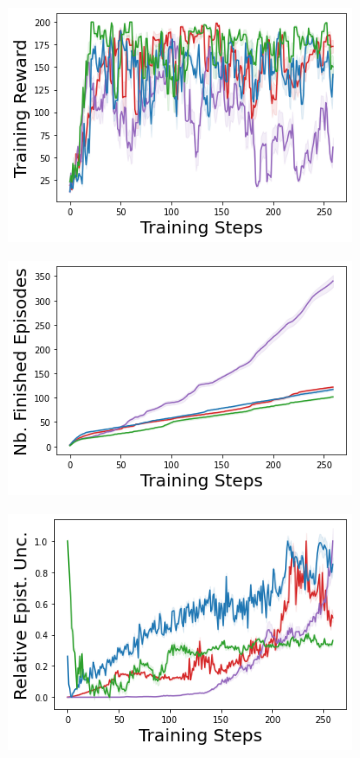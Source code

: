 \begin{figure}
    \begin{subfigure}{.24\textwidth}
        \includegraphics[width=\textwidth]{sections/011_icml2022/resources/cartpole-training_total_reward-training-model.png}
    \end{subfigure}
    \begin{subfigure}{.24\textwidth}
        \includegraphics[width=\textwidth]{sections/011_icml2022/resources/cartpole-n_finished_training_episodes-training-model.png}  
    \end{subfigure}
    \begin{subfigure}{.24\textwidth}
        \includegraphics[width=\textwidth]{sections/011_icml2022/resources/cartpole-training_epistemic_uncertainty-training-model.png}

\end{subfigure}
\end{figure}
